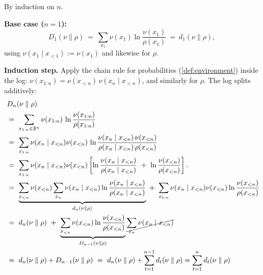 \documentclass[fontsize=11pt, parskip=half]{scrartcl}
\begin{document}
\begin{solution}
By induction on $n$.

\textbf{Base case ($n = 1$):}
\[
  D_1(\nu \parallel \rho) ~=~ \sum_{x_1} \nu(x_1) \ln \frac{\nu(x_1)}{\rho(x_1)} ~=~ d_1(\nu \parallel \rho),
\]
using $\nu(x_1 \mid x_{<1}) := \nu(x_1)$ and likewise for $\rho$.

\textbf{Induction step.} Apply the chain rule for probabilities (\cref{def:environment}) inside the log: $\nu(x_{1:n}) = \nu(x_{<n})\,\nu(x_n \mid x_{<n})$, and similarly for $\rho$. The log splits additively:
\begin{align*}
  & D_n(\nu \parallel \rho) \\
  ~&=~ \sum_{x_{1:n} \in \mathbb{B}^n} \nu(x_{1:n}) \,\ln \frac{\nu(x_{1:n})}{\rho(x_{1:n})} \\
  ~&=~ \sum_{x_{1:n}} \nu(x_n \mid x_{<n}) \nu(x_{<n}) \,\ln \frac{\nu(x_n \mid x_{<n})\,\nu(x_{<n})}
  {\rho(x_n \mid x_{<n})\,\rho(x_{<n})} \\
  ~&=~ \sum_{x_{1:n}} \nu(x_n \mid x_{<n}) \nu(x_{<n}) 
  \left[\ln \frac{\nu(x_n \mid x_{<n})}{\rho(x_n \mid x_{<n})} ~+~ \ln \frac{\nu(x_{<n})}{\rho(x_{<n})}\right]. \\
  ~&=~ \underbrace{\sum_{x_{<n}} \nu(x_{<n}) \sum_{x_n} \nu(x_n \mid x_{<n})  \ln \frac{\nu(x_n \mid x_{<n})}{\rho(x_n \mid x_{<n})} }_{d_n(\nu \parallel \rho)} ~+~
  \sum_{x_{1:n}} \nu(x_n \mid x_{<n}) \nu(x_{<n}) \ln \frac{\nu(x_{<n})}{\rho(x_{<n})} \\
  ~&=~ d_n(\nu \parallel \rho) ~+~
  \underbrace{\sum_{x_{<n}}  \nu(x_{<n}) \ln \frac{\nu(x_{<n})}{\rho(x_{<n})}}_{D_{n-1}(\nu \parallel \rho)} \cancel{\sum_{x_n} \nu(x_n \mid x_{<n})} \\
  ~&=~ d_n(\nu \parallel \rho) + D_{n-1}(\nu \parallel \rho) 
  ~=~ d_n(\nu \parallel \rho) + \sum_{t=1}^{n-1} d_t(\nu \parallel \rho)  = \sum_{t=1}^{n} d_t(\nu \parallel \rho)
\end{align*}
\end{solution}
\end{document}

